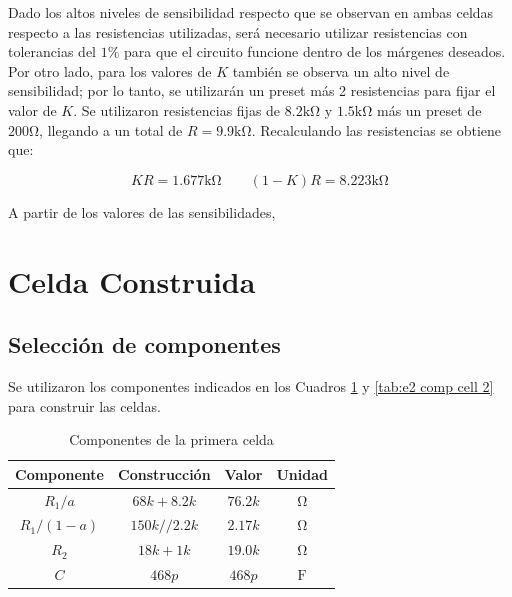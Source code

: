 Dado los altos niveles de sensibilidad respecto que se observan en ambas celdas respecto a las resistencias utilizadas, será necesario utilizar resistencias con tolerancias del $1\%$ para que el circuito funcione dentro de los márgenes deseados.
Por otro lado, para los valores de $K$ también se observa un alto nivel de sensibilidad; por lo tanto, se utilizarán un preset más 2 resistencias para fijar el valor de $K$. Se utilizaron resistencias fijas de $8.2\si{\kilo\ohm}$ y $1.5\si{\kilo\ohm}$ más un preset de $200\si{\ohm}$, llegando a un total de $R = 9.9 \si{\kilo\ohm}$. Recalculando las resistencias se obtiene que:

\begin{equation*}
KR = 1.677\si{\kilo\ohm} \qquad (1-K)R = 8.223 \si{\kilo\ohm}
\end{equation*}

A partir de los valores de las sensibilidades, 

\section{Celda Construida}

\subsection{Selección de componentes}

Se utilizaron los componentes indicados en los Cuadros \ref{tab:e2 comp cell 1} y \ref{tab:e2 comp cell 2} para construir las celdas.

\begin{table}[ht]
\begin{center}
\begin{tabular}{||c|c|c|c||}
\hline
Componente	&	Construcción	&	Valor	&	Unidad	\\
\hline
$R_1/a$	&	$68k + 8.2 k$	&	$76.2 k$	&	$\si{\ohm}$	\\
$R_1/(1-a)$	&	$150k // 2.2 k$	&	$2.17 k$	&	$\si{\ohm}$	\\
$R_2$ &	$18 k + 1 k$	&$19.0k$&	$\si{\ohm}$	\\
$C$	&	$468 p$	&	$468 p$	&	$\si{\farad}$	\\
\hline
\end{tabular}
\caption{Componentes de la primera celda}
\label{tab:e2 comp cell 1}
\end{center}
\end{table}

